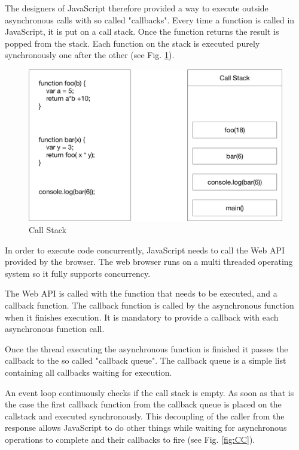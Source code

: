 The designers of JavaScript therefore provided a way to execute outside asynchronous calls
with so called "callbacks".  Every time a function is called in JavaScript, it is put on a call stack.  
Once the function returns 
the result is popped from the stack.  Each function on the stack is executed purely synchronously 
one after the other (see Fig. \ref{fig:CS}).

\begin{figure}[H]
	\centering
	\includegraphics[scale=0.6]{bilder/grundlagen/CallStack.png}
	\caption{Call Stack}
	\label{fig:CS}
\end{figure}

In order to execute code concurrently, JavaScript needs to call the Web API provided by the browser. The web browser runs on a multi threaded operating system so it fully supports concurrency. 

The Web API is called with the function that needs to be executed,  and a callback function.
The callback function is called by the asynchronous function when it finishes execution. 
It is mandatory to provide a callback with each asynchronous function call.

Once the thread executing the asynchronous function is finished it passes the callback to the so 
called "callback queue".
The callback queue is a simple list containing all callbacks waiting for execution.

An event loop continuously checks if the call stack is empty. As soon as that is the case the first 
callback function from the callback queue is placed on the callstack and executed synchronously. 
This decoupling of the caller from the response allows JavaScript to do other things while waiting 
for asynchronous operations to complete and their callbacks to fire (see Fig. \ref{fig:CC}).


